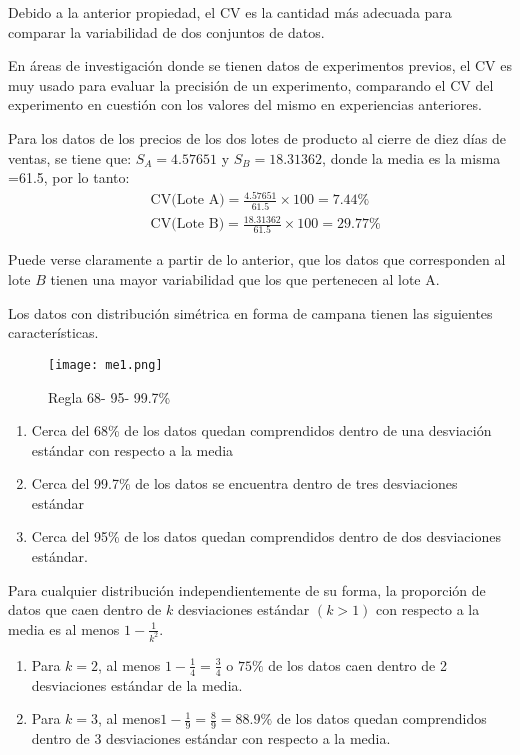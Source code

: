 Debido a la anterior propiedad, el CV es la cantidad
más adecuada para comparar la variabilidad de dos
conjuntos de datos.

En áreas de investigación donde se tienen datos de
experimentos previos, el CV es muy usado para
evaluar la precisión de un experimento, comparando
el CV del experimento en cuestión con los valores
del mismo en experiencias anteriores.

\begin{example}

    Para los datos de los precios de los dos lotes de producto al
    cierre de diez días de ventas, se tiene que:
    $S_A=4.57651$ y $S_B=18.31362$, donde la media es la misma
    =61.5, por lo tanto:
    \begin{align*}
         & \text{CV(Lote A)}=\frac{4.57651}{61.5}\times 100=7.44\%   \\
         & \text{CV(Lote B)}=\frac{18.31362}{61.5}\times 100=29.77\%
    \end{align*}
\end{example}


Puede verse claramente a partir de lo anterior, que los
datos que corresponden al lote $B$ tienen una mayor
variabilidad que los que pertenecen al lote A.

Los datos con distribución simétrica en forma de campana tienen
las siguientes características.

\begin{figure}[h!]
    \centerline{\texttt{[image: me1.png]}}
    \caption{Regla 68- 95- 99.7\%}
    \label{me1}
\end{figure}

\begin{enumerate}
    \item Cerca del 68\% de los datos quedan comprendidos dentro de una
          desviación estándar con respecto a la media
    \item Cerca del 99.7\% de los datos se encuentra dentro de tres desviaciones
          estándar
    \item Cerca del 95\% de los datos quedan comprendidos dentro de dos
          desviaciones estándar.
\end{enumerate}

\begin{theorem}
    Para cualquier distribución independientemente de su forma, la
    proporción de datos que caen dentro de $k$ desviaciones
    estándar $(k >1)$ con respecto a la media es al menos $1-\frac{1}{k^2}$.

    \begin{enumerate}
        \item Para $k = 2$, al menos $1-\frac{1}{4} = \frac{3}{4}$ o $75\%$ de los datos caen
              dentro de 2 desviaciones estándar de la media.
        \item Para $k = 3$, al menos$ 1-\frac{1}{9} = \frac{8}{9}= 88.9\%$ de los datos quedan
              comprendidos dentro de 3 desviaciones estándar con respecto
              a la media.
    \end{enumerate}
\end{theorem}

